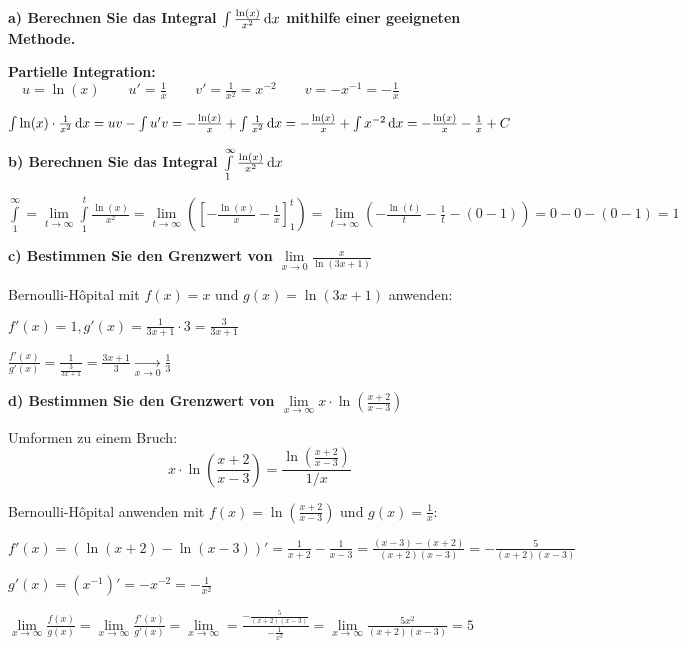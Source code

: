 \textbf{a) Berechnen Sie das Integral $\int \frac{\ln(x)}{x^2} \,\mathrm{d}x$ mithilfe einer geeigneten Methode.}

\textbf{Partielle Integration:} $\quad u = \ln(x) \quad\quad u' = \frac{1}{x} \quad\quad v' = \frac{1}{x^2} = x^{-2} \quad\quad v = -x^{-1} = -\frac{1}{x}$

$\int \ln(x) \cdot \frac{1}{x^2} \,\mathrm{d}x = uv - \int u'v = -\frac{\ln(x)}{x} + \int \frac{1}{x^2} \,\mathrm{d}x = -\frac{\ln(x)}{x} + \int x^{-2} \,\mathrm{d}x = -\frac{\ln(x)}{x} - \frac{1}{x} + C$

\textbf{b) Berechnen Sie das Integral $\int \limits_{1}^{\infty} \frac{\ln(x)}{x^2} \,\mathrm{d}x$}

$\int \limits_{1}^{\infty} = \lim \limits_{t \to \infty} \int \limits_{1}^{t} \frac{\ln(x)}{x^2} = \lim \limits_{t \to \infty} \left( \left[ -\frac{\ln(x)}{x} - \frac{1}{x} \right]_{1}^{t} \right) = \lim \limits_{t \rightarrow \infty} \left( -\frac{\ln(t)}{t} - \frac{1}{t} - (0 - 1)\right) = 0 - 0 - (0 - 1) = 1$

\textbf{c) Bestimmen Sie den Grenzwert von $\lim \limits_{x \to 0} \frac{x}{\ln(3x + 1)}$}

Bernoulli-Hôpital mit $f(x) = x$ und $g(x) = \ln(3x + 1)$ anwenden:

$f'(x) = 1, g'(x) = \frac{1}{3x + 1} \cdot 3 = \frac{3}{3x + 1}$

$\frac{f'(x)}{g'(x)} = \frac{1}{\frac{3}{3x + 1}} = \frac{3x + 1}{3} \xrightarrow[x \to 0]{} \frac{1}{3}$

\textbf{d) Bestimmen Sie den Grenzwert von $\lim \limits_{x \to \infty} x \cdot \ln\left(\frac{x + 2}{x - 3}\right)$}

Umformen zu einem Bruch: \[x \cdot \ln\left( \frac{x + 2}{x - 3} \right) = \frac{\ln\left( \frac{x + 2}{x - 3} \right)}{1/x}\]

Bernoulli-Hôpital anwenden mit $f(x) = \ln \left( \frac{x + 2}{x - 3} \right)$ und $g(x) = \frac{1}{x}$:

$f'(x) = (\ln (x + 2) - \ln(x - 3))' = \frac{1}{x + 2} - \frac{1}{x - 3} = \frac{(x - 3) - (x + 2)}{(x + 2)(x - 3)} = -\frac{5}{(x + 2)(x - 3)}$

$g'(x) = (x^{-1})' = -x^{-2} = - \frac{1}{x^2}$

$\displaystyle \lim \limits_{x \to \infty} \frac{f(x)}{g(x)} = \lim \limits_{x \to \infty} \frac{f'(x)}{g'(x)} = \lim \limits_{x \to \infty} = \frac{-\frac{5}{(x + 2)(x - 3)}}{-\frac{1}{x^2}} = \lim \limits_{x \to \infty} \frac{5x^2}{(x + 2)(x - 3)} = 5$

